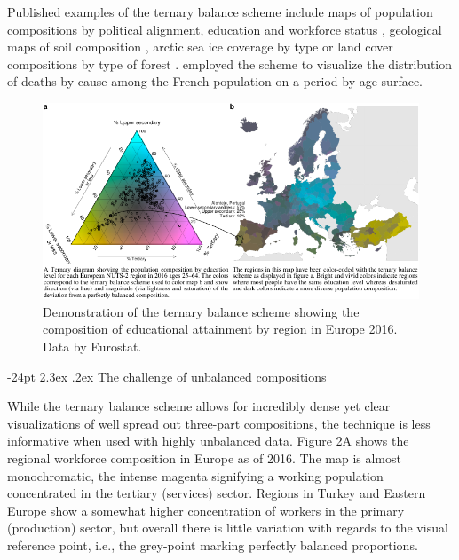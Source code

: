 \documentclass[10pt, twoside, parskip=half]{article}
\makeatletter
\def\maxwidth{\ifdim\Gin@nat@width>\linewidth\linewidth
\else\Gin@nat@width\fi}
\let\Oldincludegraphics\includegraphics
\renewcommand{\includegraphics}[1]{\Oldincludegraphics[width=\maxwidth]{#1}}
\renewcommand\section{\@startsection {section}{1}{\z@}%
                                   {-24pt}%
                                   {2.3ex \@plus.2ex}%
                                   {\normalfont\large\bfseries}}
\makeatother
\begin{document}
Published examples of the ternary balance scheme include maps of
population compositions by political alignment, education and workforce
status \citep{Dorling2012, Graetz2019, Brewer1994}, geological maps of
soil composition \citep{Metternicht2003}, arctic sea ice coverage by
type \citep{Denil2015} or land cover compositions by type of forest
\citep{Pirzamanbein2020, Steidinger2019}. \citet{Schoeley2017} employed
the scheme to visualize the distribution of deaths by cause among the
French population on a period by age surface.

\begin{figure}

{\centering \includegraphics{figure1} 

}

\caption{Demonstration of the ternary balance scheme showing the composition of educational attainment by region in Europe 2016. Data by Eurostat.}\label{fig:unnamed-chunk-1}
\end{figure}

\hypertarget{the-challenge-of-unbalanced-compositions}{%
\section{The challenge of unbalanced
compositions}\label{the-challenge-of-unbalanced-compositions}}

While the ternary balance scheme allows for incredibly dense yet clear
visualizations of well spread out three-part compositions, the technique
is less informative when used with highly unbalanced data. Figure 2A
shows the regional workforce composition in Europe as of 2016. The map
is almost monochromatic, the intense magenta signifying a working
population concentrated in the tertiary (services) sector. Regions in
Turkey and Eastern Europe show a somewhat higher concentration of
workers in the primary (production) sector, but overall there is little
variation with regards to the visual reference point, i.e., the
grey-point marking perfectly balanced proportions.
\end{document}
